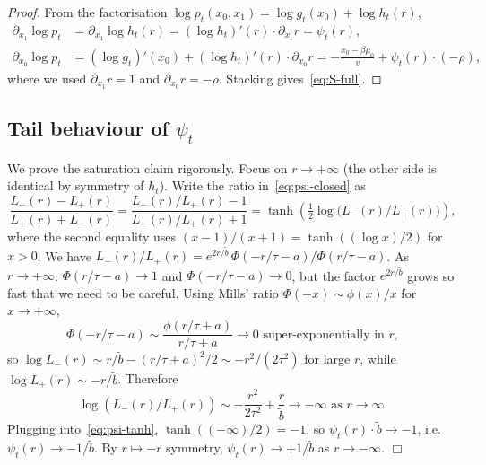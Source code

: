 \documentclass[11pt,a4paper,openany]{book}
\theoremstyle{plainserif}
\theoremstyle{definition}
\theoremstyle{remarkstyle}
\newcommand{\btilde}{\tilde{b}}
\begin{document}
\begin{proof}
From the factorisation $\log p_t(x_0,x_1) = \log g_t(x_0) + \log h_t(r)$,
\begin{align}
\partial_{x_1} \log p_t &= \partial_{x_1} \log h_t(r) = (\log h_t)'(r)\cdot \partial_{x_1} r = \psi_t(r),\\
\partial_{x_0} \log p_t &= (\log g_t)'(x_0) + (\log h_t)'(r)\cdot \partial_{x_0} r
                        = -\frac{x_0-\beta\mu_0}{v} + \psi_t(r)\cdot(-\rho),
\end{align}
where we used $\partial_{x_1} r = 1$ and $\partial_{x_0} r = -\rho$.
Stacking gives~\eqref{eq:S-full}.
\end{proof}

\subsection*{Tail behaviour of $\psi_t$}

We prove the saturation claim rigorously. Focus on $r\to+\infty$ (the other
side is identical by symmetry of $h_t$). Write the ratio in~\eqref{eq:psi-closed} as
\begin{equation}
\frac{L_-(r) - L_+(r)}{L_+(r) + L_-(r)}
 = \frac{L_-(r)/L_+(r) - 1}{L_-(r)/L_+(r) + 1}
 = \tanh\!\left(\tfrac{1}{2}\log\bigl(L_-(r)/L_+(r)\bigr)\right),
\label{eq:psi-tanh}
\end{equation}
where the second equality uses $(x-1)/(x+1) = \tanh((\log x)/2)$ for $x > 0$.
We have $L_-(r)/L_+(r) = e^{2r/\btilde}\,\Phi(-r/\tau - a)/\Phi(r/\tau - a)$.
As $r\to+\infty$: $\Phi(r/\tau - a) \to 1$ and $\Phi(-r/\tau - a) \to 0$,
but the factor $e^{2r/\btilde}$ grows so fast that we need to be careful.
Using Mills' ratio $\Phi(-x) \sim \phi(x)/x$ for $x\to +\infty$,
\begin{equation}
\Phi(-r/\tau - a) \sim \frac{\phi(r/\tau + a)}{r/\tau + a}\to 0 \text{ super-exponentially in }r,
\end{equation}
so $\log L_-(r) \sim r/\btilde - (r/\tau + a)^2/2 \sim -r^2/(2\tau^2)$ for large $r$,
while $\log L_+(r) \sim -r/\btilde$. Therefore
\begin{equation}
\log(L_-(r)/L_+(r)) \sim -\frac{r^2}{2\tau^2} + \frac{r}{\btilde} \to -\infty \text{ as }r\to\infty.
\end{equation}
Plugging into~\eqref{eq:psi-tanh}, $\tanh((-\infty)/2) = -1$, so
$\psi_t(r)\cdot \btilde \to -1$, i.e.\ $\psi_t(r) \to -1/\btilde$.
By $r\mapsto -r$ symmetry, $\psi_t(r)\to +1/\btilde$ as $r\to-\infty$. $\Box$
\end{document}
